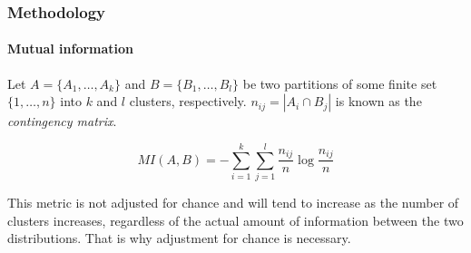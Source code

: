 \documentclass{tum-presentation}
\begin{document}
\begin{frame}
	\frametitle{Methodology}
	\framesubtitle{Mutual information}
	Let $A = \{A_1,\ldots,A_k\}$ and $B = \{B_1,\ldots,B_l\}$  be two partitions of some finite set $\{1,\ldots,n\}$ into $k$ and $l$ clusters, respectively.  $n_{ij} = |A_i \cap B_j|$ is known as the {\it contingency matrix}. 
	
	\vspace{0.5cm}
	
	\begin{equation}
	MI(A, B) = -\sum_{i=1}^k\sum_{j=1}^l \frac {n_{ij}}n \log \frac {n_{ij}}n
	\end{equation}
	
	\vspace{1cm}
	
	\begin{tcolorbox}
		\begin{center}
			This metric is not adjusted for chance and will tend to increase as the number of clusters increases, regardless of the actual amount of information between the two distributions. That is why adjustment for chance is necessary.
		\end{center}
	\end{tcolorbox}
	
\end{frame}
\end{document}
